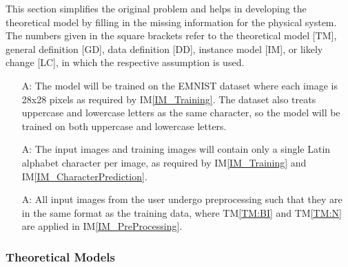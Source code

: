 \documentclass[12pt]{article}
\newcounter{assumpnum} %
\begin{document}

This section simplifies the original problem and helps in developing the
theoretical model by filling in the missing information for the physical system.
The numbers given in the square brackets refer to the theoretical model [TM],
general definition [GD], data definition [DD], instance model [IM], or likely
change [LC], in which the respective assumption is used.

\begin{itemize}

\item[A\refstepcounter{assumpnum}\theassumpnum \label{A_EMNIST}:] The model will be trained on the EMNIST dataset where each image is 28x28 pixels as required by IM\ref{IM_Training}. The dataset also treats uppercase and lowercase letters as the same character, so the model will be trained on both uppercase and lowercase letters.
\item[A\refstepcounter{assumpnum}\theassumpnum \label{A_Latin}:] The input images and training images will contain only a single Latin alphabet character per image, as required by IM\ref{IM_Training} and IM\ref{IM_CharacterPrediction}.
\item[A\refstepcounter{assumpnum}\theassumpnum \label{A_Preprocessing}:] All
input images from the user undergo preprocessing such that they are in the same
format as the training data, where TM\ref{TM:BI} and TM\ref{TM:N} are applied in
IM\ref{IM_PreProcessing}.

\end{itemize}

\subsubsection{Theoretical Models}\label{sec_theoretical}
\end{document}
